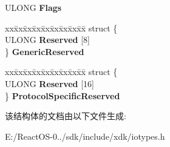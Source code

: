 \begin{DoxyCompactItemize}
U\+L\+O\+NG {\bfseries Flags}
\item 
\mbox{\label{struct___f_i_l_e___r_e_m_o_t_e___p_r_o_t_o_c_o_l___i_n_f_o_r_m_a_t_i_o_n_a9d62fb408faaf39285fd43dcfd95b019}} 
\begin{tabbing}
xx\=xx\=xx\=xx\=xx\=xx\=xx\=xx\=xx\=\kill
struct \{\\
\>ULONG {\bfseries Reserved} \mbox{[}8\mbox{]}\\
\} {\bfseries GenericReserved}\\

\end{tabbing}\item 
\mbox{\label{struct___f_i_l_e___r_e_m_o_t_e___p_r_o_t_o_c_o_l___i_n_f_o_r_m_a_t_i_o_n_a057c4ef87270c1c28cdf6ecefde3c983}} 
\begin{tabbing}
xx\=xx\=xx\=xx\=xx\=xx\=xx\=xx\=xx\=\kill
struct \{\\
\>ULONG {\bfseries Reserved} \mbox{[}16\mbox{]}\\
\} {\bfseries ProtocolSpecificReserved}\\

\end{tabbing}\end{DoxyCompactItemize}


该结构体的文档由以下文件生成\+:\begin{DoxyCompactItemize}
\item 
E\+:/\+React\+O\+S-\/0../sdk/include/xdk/iotypes.\+h\end{DoxyCompactItemize}
